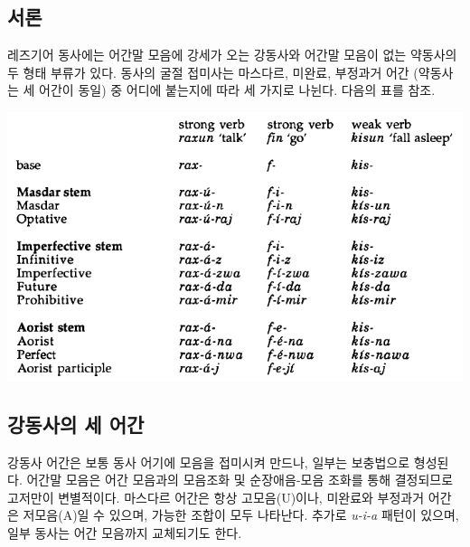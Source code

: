 \subsection{서론}
레즈기어 동사에는 어간말 모음에 강세가 오는 강동사와 어간말 모음이 없는 약동사의 두 형태 부류가 있다. 동사의 굴절 접미사는 마스다르, 미완료, 부정과거 어간 (약동사는 세 어간이 동일) 중 어디에 붙는지에 따라 세 가지로 나뉜다. 다음의 표를 참조.
\begin{center}
\includegraphics{Lezgian/src/verb.png}
\end{center}
\subsection{강동사의 세 어간}
강동사 어간은 보통 동사 어기에 모음을 접미시켜 만드나, 일부는 보충법으로 형성된다. 어간말 모음은 어간 모음과의 모음조화 및 순장애음-모음 조화를 통해 결정되므로 고저만이 변별적이다. 마스다르 어간은 항상 고모음(U)이나, 미완료와 부정과거 어간은 저모음(A)일 수 있으며, 가능한 조합이 모두 나타난다. 추가로 \textit{u-i-a} 패턴이 있으며, 일부 동사는 어간 모음까지 교체되기도 한다. 

